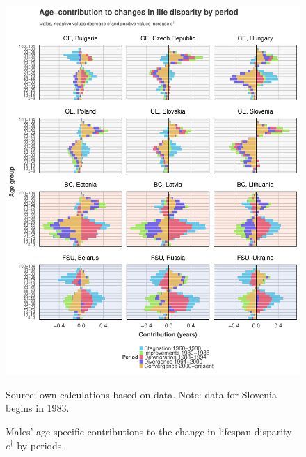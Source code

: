 \documentclass{article}
\begin{document}
\begin{figure}[h!]
\caption{Males' age-specific contributions to the change in lifespan disparity $e^\dagger$ by periods.}
\label{MalesDecomp}
\centering
\begin{center}
\includegraphics[scale=.85]{Figures/Age_ed_decomp_Males.pdf}
\end{center}
Source: own calculations based on \citet{HMD} data. Note: data for Slovenia begins in 1983.
\end{figure}

\newpage
\end{document}

